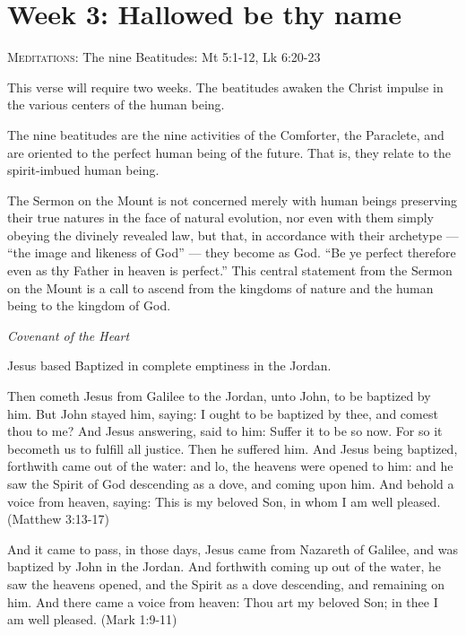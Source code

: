 \section{Week 3: Hallowed be thy name}

\textsc{Meditations}: The nine Beatitudes: Mt 5:1-12, Lk 6:20-23

This verse will require two weeks. The beatitudes awaken the Christ impulse in the various centers of the human being.

The nine beatitudes are the nine activities of the Comforter, the Paraclete, and are oriented to the perfect human being
of the future. That is, they relate to the spirit-imbued human being.

\begin{quotationx}
The Sermon on the Mount is not concerned merely with human beings preserving their true natures in the face of natural
evolution, nor even with them simply obeying the divinely revealed law, but that, in accordance with their archetype
— “the image and likeness of God” — they become as God. “Be ye perfect
therefore even as thy Father in heaven is perfect.” This central statement from the Sermon on the Mount is a call to
ascend from the kingdoms of nature and the human being to the kingdom of God. 
\begin{flushright}\textit{Covenant of the Heart}\end{flushright}

\end{quotationx}
Jesus based Baptized in complete emptiness in the Jordan.

Then cometh Jesus from Galilee to the Jordan, unto John, to be baptized by him. But John stayed him, saying: I ought to
be baptized by thee, and comest thou to me? And Jesus answering, said to him: Suffer it to be so now. For so it
becometh us to fulfill all justice. Then he suffered him. And Jesus being baptized, forthwith came out of the water:
and lo, the heavens were opened to him: and he saw the Spirit of God descending as a dove, and coming upon him. And
behold a voice from heaven, saying: This is my beloved Son, in whom I am well pleased. (Matthew 3:13-17)

And it came to pass, in those days, Jesus came from Nazareth of Galilee, and was baptized by John in the Jordan. And
forthwith coming up out of the water, he saw the heavens opened, and the Spirit as a dove descending, and remaining on
him. And there came a voice from heaven: Thou art my beloved Son; in thee I am well pleased. (Mark 1:9-11)

